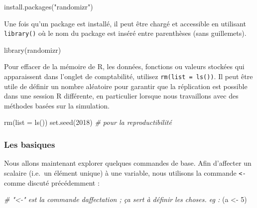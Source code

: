 \documentclass[
  12pt,
]{book}
\newenvironment{Shaded}{\begin{snugshade}}{\end{snugshade}}
\newcommand{\AttributeTok}[1]{\textcolor[rgb]{0.77,0.63,0.00}{#1}}
\newcommand{\CommentTok}[1]{\textcolor[rgb]{0.56,0.35,0.01}{\textit{#1}}}
\newcommand{\DecValTok}[1]{\textcolor[rgb]{0.00,0.00,0.81}{#1}}
\newcommand{\FunctionTok}[1]{\textcolor[rgb]{0.00,0.00,0.00}{#1}}
\newcommand{\NormalTok}[1]{#1}
\newcommand{\OtherTok}[1]{\textcolor[rgb]{0.56,0.35,0.01}{#1}}
\newcommand{\StringTok}[1]{\textcolor[rgb]{0.31,0.60,0.02}{#1}}
\begin{document}
\begin{Shaded}
\begin{Highlighting}[]
\FunctionTok{install.packages}\NormalTok{(}\StringTok{"randomizr"}\NormalTok{)}
\end{Highlighting}
\end{Shaded}

Une fois qu'un package est installé, il peut être chargé et accessible en utilisant \texttt{library()} où le nom du package est inséré entre parenthèses (sans guillemets).

\begin{Shaded}
\begin{Highlighting}[]
\FunctionTok{library}\NormalTok{(randomizr)}
\end{Highlighting}
\end{Shaded}

Pour effacer de la mémoire de R, les données, fonctions ou valeurs stockées qui apparaissent dans l'onglet de comptabilité, utilisez \texttt{rm(list\ =\ ls())}. Il peut être utile de définir un nombre aléatoire pour garantir que la réplication est possible dans une session R différente, en particulier lorsque nous travaillons avec des méthodes basées sur la simulation.

\begin{Shaded}
\begin{Highlighting}[]
\FunctionTok{rm}\NormalTok{(}\AttributeTok{list =} \FunctionTok{ls}\NormalTok{())}
\FunctionTok{set.seed}\NormalTok{(}\DecValTok{2018}\NormalTok{) }\CommentTok{\# pour la reproductibilité}
\end{Highlighting}
\end{Shaded}

\hypertarget{les-basiques}{%
\subsubsection{Les basiques}\label{les-basiques}}

Nous allons maintenant explorer quelques commandes de base. Afin d'affecter un scalaire (i.e.~un élément unique) à une variable, nous utilisons la commande \texttt{\textless{}-} comme discuté précédemment :

\begin{Shaded}
\begin{Highlighting}[]
\CommentTok{\# "\textless{}{-}"  est la commande d\textquotesingle{}affectation ; ça sert à définir les choses. eg :}
\NormalTok{(a }\OtherTok{\textless{}{-}} \DecValTok{5}\NormalTok{)}
\end{Highlighting}
\end{Shaded}
\end{document}
